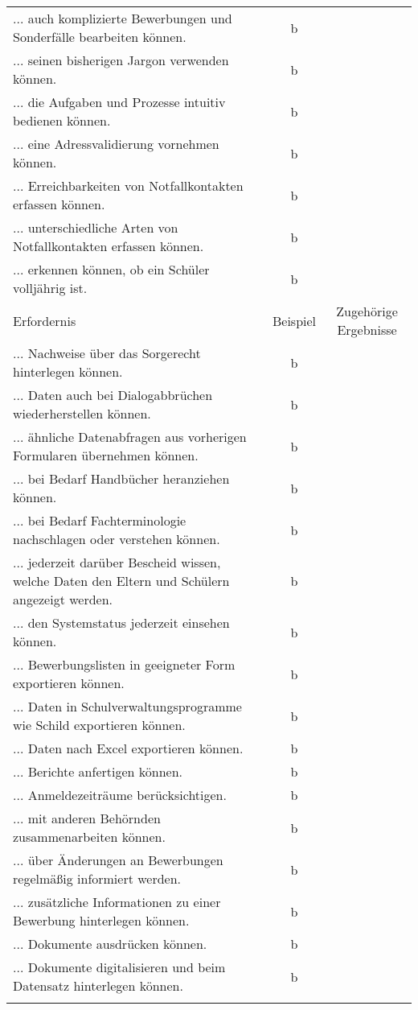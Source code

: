 \begin{landscape}
\begin{longtable}{p{15cm}cc}
            ... auch komplizierte Bewerbungen und Sonderfälle bearbeiten können. & b \\
            ... seinen bisherigen Jargon verwenden können. & b \\
            ... die Aufgaben und Prozesse intuitiv bedienen können. & b \\
            ... eine Adressvalidierung vornehmen können. & b \\
            ... Erreichbarkeiten von Notfallkontakten erfassen können. & b \\
            ... unterschiedliche Arten von Notfallkontakten erfassen können. & b \\
            ... erkennen können, ob ein Schüler volljährig ist. & b \\
        \endfirsthead
        \toprule
        Erfordernis & Beispiel & Zugehörige Ergebnisse \\
        \midrule
        \endhead
        \bottomrule
        \endfoot
            ... Nachweise über das Sorgerecht hinterlegen können. & b \\
            ... Daten auch bei Dialogabbrüchen wiederherstellen können. & b \\
            ... ähnliche Datenabfragen aus vorherigen Formularen übernehmen können. & b \\
            ... bei Bedarf Handbücher heranziehen können. & b \\
            ... bei Bedarf Fachterminologie nachschlagen oder verstehen können. & b \\
            ... jederzeit darüber Bescheid wissen, welche Daten den Eltern und Schülern angezeigt werden. & b \\
            ... den Systemstatus jederzeit einsehen können. & b \\
            ... Bewerbungslisten in geeigneter Form exportieren können. & b \\
            ... Daten in Schulverwaltungsprogramme wie Schild exportieren können. & b \\
            ... Daten nach Excel exportieren können. & b \\
            ... Berichte anfertigen können. & b \\
            ... Anmeldezeiträume berücksichtigen. & b \\
            ... mit anderen Behörnden zusammenarbeiten können. & b \\
            ... über Änderungen an Bewerbungen regelmäßig informiert werden. & b \\
            ... zusätzliche Informationen zu einer Bewerbung hinterlegen können. & b \\
            ... Dokumente ausdrücken können. & b \\
            ... Dokumente digitalisieren und beim Datensatz hinterlegen können. & b \\
    \label{tab:anmeldeformular}
\end{longtable}


\end{landscape}
